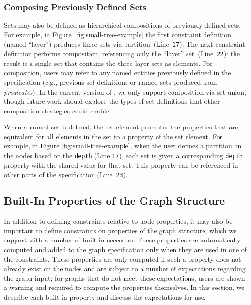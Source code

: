 \subsubsection{Composing Previously Defined Sets}
Sets may also be defined as hierarchical
compositions of previously defined sets. For example, in
Figure~\ref{fig:small-tree-example} the first constraint definition
(named ``layer'') produces three sets via
partition~(Line~\texttt{17}). The next constraint definition performs 
composition, referencing only the ``layer'' set~(Line~\texttt{22}): the result
is a single set that contains the three layer sets as elements.
For composition, users may
refer to any named entities previously defined in the specification (e.g.,
previous set definitions or named sets produced from \emph{predicates}).
In the current version of \projectname, we only support composition via
set union, though future work should explore the types of set definitions
that other composition strategies could enable.

When a named set is defined, the set element promotes the properties that
are equivalent for all elements in the set to a property of the set
element. For example, in Figure \ref{fig:small-tree-example}, when the user
defines a partition on the nodes based on the \texttt{depth} (Line
\texttt{17}), each set is given a corresponding \texttt{depth} property with
the shared value for that set. This property can be referenced in other 
parts of the \projectname specification (Line~\texttt{23}).

\subsection{Built-In Properties of the Graph Structure}
\label{sec:built-in-properties}

In addition to defining constraints relative to node properties, it may
also be important to define constraints on properties
of the graph structure, which we support with a number of built-in accessors.
These properties are automatically computed and added to the graph 
specification only when they are used in one of the \projectname constraints. 
These properties are only computed if such a property does not
already exist on the nodes and are subject to a number of expectations
regarding the graph input; for graphs that do not meet these expectations,
users are shown a warning and required to compute the properties
themselves. In this section, we describe each built-in property and discuss 
the expectations for use.

